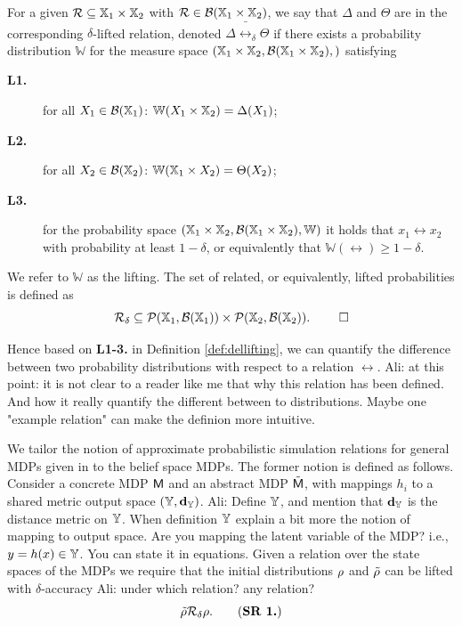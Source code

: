 \documentclass{ifacconf}
\renewcommand{\axx}[1]{{\color{orange} Ali: #1}}
\begin{document}
\begin{definition}\label{def:dellifting}
For a given 
	$\mathcal{R}\subseteq {\mathbb{X}}_1\times {\mathbb{X}}_2$ with $\mathcal{R}\in \mathcal B({\mathbb{X}}_1\times {\mathbb{X}}_2)$, we say that  $\Delta$ and $ \Theta$ are in the corresponding $\delta$-lifted relation, denoted $\Delta \bar \rel_\delta \Theta$  if there exists a probability distribution $\mathbb W$ for the measure space $({\mathbb{X}}_1\times {\mathbb{X}}_2,\mathcal B({\mathbb{X}}_1\times {\mathbb{X}}_2),)$
	satisfying { \setlength{\parskip}{-1pt}\setlength{\parsep}{0pt}
		\begin{description}
			\item[\textbf{L1.}] for all $X_1\in \mathcal{B}({\mathbb{X}}_1)$: $\mathbb W(X_1\times {\mathbb{X}}_2)=\Delta(X_1)$;
			\item [\textbf{L2.}] for all $X_2\in \mathcal{B}({\mathbb{X}}_2)$:  $\mathbb W({\mathbb{X}}_1\times X_2)=\Theta(X_2)$;
			\item[\textbf{L3.}] for the probability space  $({\mathbb{X}}_1\times {\mathbb{X}}_2,\mathcal B({\mathbb{X}}_1\times {\mathbb{X}}_2), \mathbb W)$ it holds that
			$x_1\rel x_2$ with probability at least $1-\delta$, or equivalently that $\mathbb{W}\left(\rel\right)\geq1-\delta$.
	\end{description}}%
	
We refer to  $\mathbb W$ as the lifting. %
The set of related, or equivalently, lifted probabilities is defined as 
	\[\bar\rel_\delta\subseteq \mathcal{P}(\X_1,\mathcal B(\X_1))\times \mathcal{P}(\X_2,\mathcal B(\X_2)). \hfill \mbox{ }\qed\] 

\end{definition}

Hence based on \textbf{L1-3.} in Definition \ref{def:dellifting}, we can quantify the difference between two probability distributions with respect to a relation $\rel$.
\axx{at this point: it is not clear to a reader like me that why this relation has been defined. And how it really quantify the different between to distributions. Maybe one "example relation" can make the definion more intuitive.}
 
We tailor the notion of approximate probabilistic simulation relations for general MDPs given in \citep{haesaert2017verification} to the belief space MDPs.
  The former notion is defined as follows. 
Consider a concrete MDP $\mathsf{M}$ and an abstract  MDP $\tilde{\mathsf{M}}$, with mappings $h_i$ to a shared {metric} output space  $({\mathbb{Y}},\mathbf{d}_{\mathbb{Y}})$. \axx{Define ${\mathbb{Y}}$, and mention that $\mathbf{d}_{\mathbb{Y}}$ is the distance metric on ${\mathbb{Y}}$. When definition ${\mathbb{Y}}$ explain a bit more the notion of mapping to output space. Are you mapping the latent variable of the MDP? i.e., $y=h(x)\in{\mathbb{Y}}$. You can state it in equations.} 
Given a relation over the state spaces of the MDPs we require that the initial distributions $\rho$ and $\tilde{\rho}$ can be lifted with $\delta$-accuracy \axx{under which relation? any relation?}
\begin{equation}
\tilde\init \bar \rel_\delta \init.
	\tag{\textbf{SR 1.}}
\end{equation}
  
\end{document}
